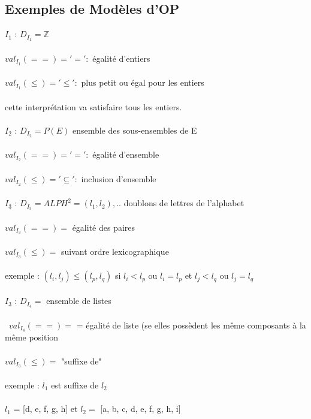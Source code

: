 \subsection{Exemples de Modèles d'OP}
\underline{$I_{1}$} : $D_{I_{1}} =  \mathbb{Z}$ \\ \\
$ val_{I_{1}}(==) = '=' :$ égalité d'entiers \\ \\
$ val_{I_{1}}(\leq) = '\leq' :$ plus petit ou égal pour les entiers\\ \\
cette interprétation va satisfaire tous les entiers.\\ \\
\underline{$I_{2}$} : $D_{I_{2}} =  P(E)$ ensemble des sous-ensembles de E\\ \\
$ val_{I_{2}}(==) = '=' :$ égalité d'ensemble \\ \\
$ val_{I_{2}}(\leq) = '\subseteq' :$ inclusion d'ensemble\\ \\
\underline{$I_{3}$} : $D_{I_{3}} = ALPH^{2} = {(l_{1},l_{2}),..}$ doublons de lettres de l'alphabet\\ \\
$ val_{I_{3}}(==) = $ égalité des paires \\ \\
$ val_{I_{3}}(\leq) =$ suivant ordre lexicographique\\ \\
exemple : $(l_{i},l_{j}) \leq (l_{p},l_{q})$ si $ l_{i} < l_{p}$ ou $ l_{i} = l_{p}$ et $ l_{j} < l_{q}$ ou $ l_{j} = l_{q}$\\ \\ 
\underline{$I_{3}$} : $D_{I_{4}} =$ ensemble de listes\\ \\\
$ val_{I_{4}}(==) = $ = égalité de liste (se elles possèdent les même composants à la même position\\ \\
$ val_{I_{3}}(\leq) =$ "suffixe de" \\ \\
exemple : $l_{1} $ est suffixe de $l_{2}$ \\ \\
$l_{1} $ = [d, e, f, g, h] et $l_{2} =$ [a, b, c, d, e, f, g, h, i]